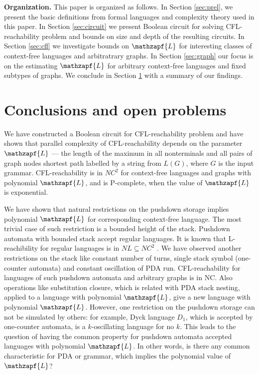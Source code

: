 \documentclass[smallextended]{svjour3}       %
\begin{document}
\textbf{Organization.} This paper is organized as follows. In Section \ref{sec:prel}, we present the basic definitions from formal languages and complexity theory used in this paper. In Section \ref{sec:circuit} we present Boolean circuit for solving CFL-reachability problem and bounds on size and depth of the resulting circuits. In Section \ref{sec:cfl} we investigate bounds on $\mathzapf{L}$ for interesting classes of context-free languages and arbitratrary graphs. In Section \ref{sec:graph} our focus is on the estimating $\mathzapf{L}$ for arbitrary context-free languages and fixed subtypes of graphs. We conclude in Section \ref{sec:conc} with a summary of our findings.




\section{Conclusions and open problems}
\label{sec:conc}
We have constructed a Boolean circuit for CFL-reachability problem and have shown that parallel complexity of CFL-reachability depends on the parameter $\mathzapf{L}$ --- the length of the maximum in all nonterminals and all pairs of graph nodes shortest path labelled by a string from $L(G)$, where $G$ is the input grammar. CFL-reachability is in $NC^2$ for context-free languages and graphs with polynomial $\mathzapf{L}$, and is P-complete, when the value of $\mathzapf{L}$ is exponential.

 We have shown that natural restrictions on the pushdown storage implies polynomial $\mathzapf{L}$ for corresponding context-free language. The most trivial case of such restriction is a bounded height of the stack. Pushdown automata with bounded stack accept regular languages. It is known that L-reachibility for regular languages is in $NL \subseteq NC^2$ \cite*{LReach, Yannakakis}. We have observed another restrictions on the stack like constant number of turns, single stack symbol (one-counter automata) and constant oscillation of PDA run. CFL-reachability for languages of such pushdown automata and arbitrary graphs is in NC. Also operations like substitution closure, which is related with PDA stack nesting, applied to a language with polynomial $\mathzapf{L}$, give a new language with polynomial $\mathzapf{L}$. However, one restriction on the pushdown storage can not be simulated by others: for example, Dyck language $D_1$, which is accepted by one-counter automata, is a $k$-oscillating language for no $k$. This leads to the question of having the common property for pushdown automata accepted languages with polynomial $\mathzapf{L}$. In other words, is there any common characteristic for PDA or grammar, which implies the polynomial value of $\mathzapf{L}$?
\end{document}
